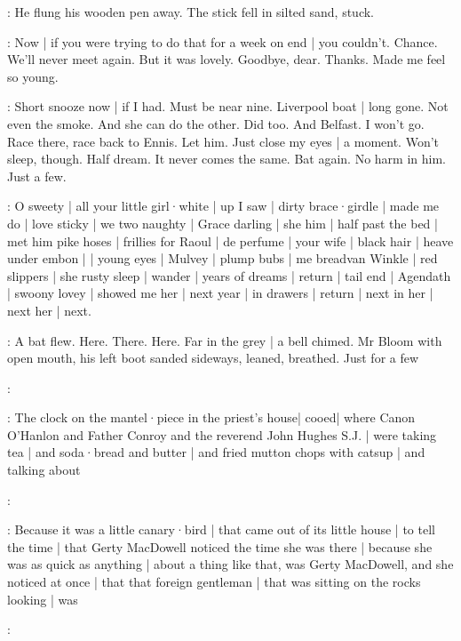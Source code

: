 :
He flung his wooden pen away.%
The stick fell in silted sand,
stuck.

\BloomCurrent:
Now |
if you were trying to do that for a week on end |
you couldn't.
Chance.
We'll never meet again.
But it was lovely.
Goodbye,
dear.
Thanks.
Made me feel so young.

\BloomCurrent:
Short snooze now |
if I had.
Must be near nine.
Liverpool boat |
long gone.
Not even the smoke.
And she can do the other.
Did too.
And Belfast.
I won't go.
Race there,
race back to Ennis.
Let him.
Just close my eyes |
a moment.
Won't sleep,
though.
Half dream.
It never comes the same.
Bat again.
No harm in him.
Just a few.

\BloomToday:
O sweety |
all your little girl·white |
up I saw |
dirty brace·girdle |
made me do |
love sticky |
we two naughty |
Grace darling |%
she him |
half past the bed |
met him pike hoses |
frillies for Raoul |
de perfume |
your wife |
black hair |
heave under embon |
 |
young eyes |
Mulvey |
plump bubs |
me breadvan Winkle |
red slippers |
she rusty sleep |
wander |
years of dreams |
return |
tail end |
Agendath |
swoony lovey |
showed me her |
next year |
in drawers |
return |
next in her |
next her |
next.

:
A bat flew.
Here.
There.
Here.
Far in the grey |
a bell chimed.
Mr Bloom with open mouth,
his left boot sanded sideways,
leaned,
breathed.
Just for a few

:

\Nrelig:
The clock on the mantel·piece in the priest's house| 
cooed| 
where Canon O'Hanlon
and Father Conroy
and the reverend John Hughes S.J. | 
were taking tea |
and soda·bread and butter |
and fried mutton chops with catsup |
and talking about

:

:
Because it was a little canary·bird |
that came out of its little house |
to tell the time |
that Gerty MacDowell noticed the time she was there |%
because she was as quick as anything |
about a thing like that,
was Gerty MacDowell,
and she noticed at once |
that that foreign gentleman |
that was sitting on the rocks looking |
was

:
